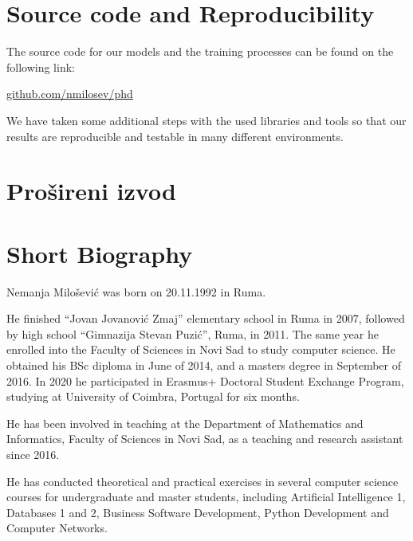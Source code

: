 \documentclass[b5paper]{book}
\newcommand{\skica}[1]{
    \noindent \framebox{\parbox[c]{0.9\textwidth}{  {\small** {#1}  }}
    \newline }
}
\begin{document}
\chapter{Source code and Reproducibility}
\label{source}

The source code for our models and the training processes can be found on the following link: 

\begin{footnotesize}
\url{github.com/nmilosev/phd}
\end{footnotesize}

We have taken some additional steps with the used libraries and tools so that our results are reproducible and testable in many different environments.

\backmatter


{
  \raggedright
  \printbibliography[heading=bibintoc]
}


\chapter{Prošireni izvod}




\chapter{Short Biography}


Nemanja Milošević was born on 20.11.1992 in Ruma.

He finished ``Jovan Jovanović Zmaj'' elementary school in Ruma in 2007,
followed by high school ``Gimnazija Stevan Puzić'', Ruma, in 2011. The same year he enrolled into the Faculty of Sciences in Novi Sad to study computer science. He obtained his BSc diploma in June of 2014, and a masters degree in September of 2016. In 2020 he participated in Erasmus+ Doctoral Student Exchange Program, studying at University of Coimbra, Portugal for six months.

He has been involved in teaching at the Department of Mathematics and
Informatics, Faculty of Sciences in Novi Sad, as a teaching and research assistant since 2016.

He has conducted theoretical and practical exercises in several
computer science courses for undergraduate and master students,
including Artificial Intelligence 1, Databases 1 and 2, Business Software Development, Python Development and Computer Networks.
\end{document}
